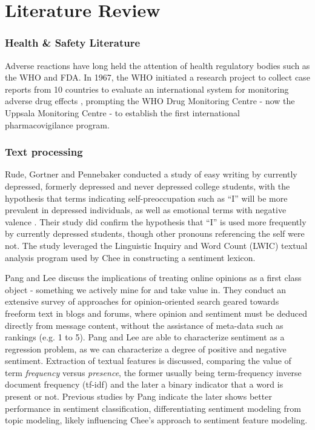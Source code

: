 \documentclass[twoside,11pt]{article}
\begin{document}
\section{Literature Review}

\subsubsection{Health & Safety Literature}
Adverse reactions have long held the attention of health regulatory bodies such as the WHO and FDA. In 1967, the WHO initiated a research project to collect case reports from 10 countries to evaluate an international system for monitoring adverse drug effects \citep{WHO}, prompting the WHO Drug Monitoring Centre - now the Uppsala Monitoring Centre - to establish the first international pharmacovigilance program.

\subsubsection{Text processing}
Rude, Gortner and Pennebaker conducted a study of easy writing by currently depressed, formerly depressed and never depressed college students, with the hypothesis that terms indicating self-preoccupation such as ``I'' will be more prevalent in depressed individuals, as well as emotional terms with negative valence \citep{Rude}. Their study did confirm the hypothesis that ``I'' is used more frequently by currently depressed students, though other pronouns referencing the self were not. The study leveraged the Linguistic Inquiry and Word Count (LWIC) textual analysis program used by Chee in constructing a sentiment lexicon.

Pang and Lee \citep{Pang} discuss the implications of treating online opinions as a first class object - something we actively mine for and take value in. They conduct an extensive survey of approaches for opinion-oriented search geared towards freeform text in blogs and forums, where opinion and sentiment must be deduced directly from message content, without the assistance of meta-data such as rankings (e.g.  1 to 5). Pang and Lee are able to characterize sentiment as a regression problem, as we can characterize a degree of positive and negative sentiment. Extraction of textual features is discussed, comparing the value of term \textit{frequency} versus \textit{presence}, the former usually being term-frequency inverse document frequency (tf-idf) and the later a binary indicator that a word is present or not. Previous studies by Pang indicate the later shows better performance in sentiment classification, differentiating sentiment modeling from topic modeling, likely influencing Chee's approach to sentiment feature modeling.
\end{document}
